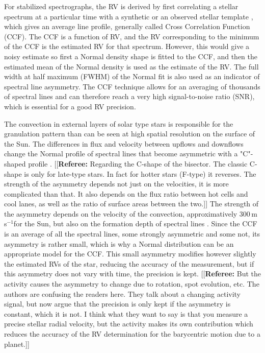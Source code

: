 \documentclass[11pt, oneside]{article}
\def\ms{\hbox{\,m\,s$^{-1}$}}         %
\newcommand{\comment}[1]{{\color{red}[[\textbf{Referee: }#1]]}}
\begin{document}
For stabilized spectrographs, the RV is derived by first correlating a stellar spectrum at a particular time with a synthetic \citep[][]{Baranne-1996,Pepe-2002a} or an observed stellar template \citep[][]{Anglada-Escude-2012}, which gives an average line profile, generally called Cross Correlation Function (CCF).  The CCF is a function of RV, and the RV corresponding to the minimum of the CCF is the estimated RV for that spectrum.  However, this would give a noisy estimate so first a Normal density shape is fitted to the CCF, and then the estimated mean of the Normal density is used as the estimate of the RV.  The full width at half maximum (FWHM) of the Normal fit is also used as an indicator of spectral line asymmetry.
The CCF technique allows for an averaging of thousands of spectral lines and can therefore reach a very high signal-to-noise ratio (SNR), which is essential for a good RV precision.

The convection in external layers of solar type stars is responsible for the granulation pattern than can be seen at high spatial resolution on the surface of the Sun. The differences in flux and velocity between upflows and downflows change the Normal profile of spectral lines that become asymmetric with a "C"-shaped profile \citep[][]{Dravins-1981}. 
\comment{Regarding the C-shape of the bisector. The classic C-shape is only for late-type stars. In fact for hotter stars (F-type) it reverses.
The strength of the asymmetry depends not just on the velocities, it is more complicated than that. It also depends on the flux ratio between hot cells and cool lanes, as well as the ratio of surface areas between the two.}
The strength of the asymmetry depends on the velocity of the convection, approximatively 300\ms for the Sun, but also on the formation depth of spectral lines \citep{Gray-2009}. Since the CCF is an average of all the spectral lines, some strongly asymmetric and some not, its asymmetry is rather small, which is why a Normal distribution can be an appropriate model for the CCF. This small asymmetry modifies however slightly the estimated RVs of the star, reducing the accuracy of the measurement, but if this asymmetry does not vary with time, the precision is kept.
\comment{But the activity causes the asymmetry to change due to rotation, spot evolution, etc. The authors are confusing the readers here. They talk about a changing activity signal, but now argue that the precision is only kept if the asymmetry is constant, which it is not. I think what they want to say is that you measure a precise stellar radial velocity, but the activity makes its own contribution which reduces the accuracy of the RV determination for the barycentric motion due to a planet.}
\end{document}
